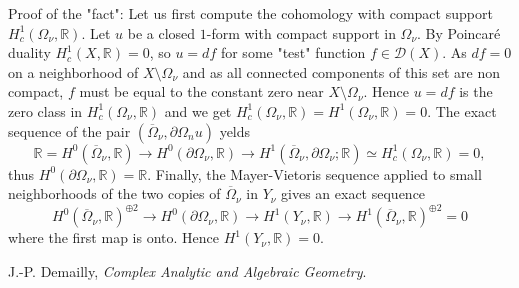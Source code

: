 \documentclass[12pt]{article}
\begin{document}
Proof of the "fact": Let us first compute the cohomology with compact support $H^1_c(\Omega_\nu,\mathbb R)$. Let $u$ be a closed $1$-form with compact support in $\Omega_\nu$. By Poincar\'e duality $H^1_c(X,\mathbb R)=0$, so $u=df$ for some "test" function $f\in\mathcal D(X)$. As $df=0$ on a neighborhood of $X\setminus\Omega_\nu$ and as all connected components of this set are non compact, $f$ must be equal to the constant zero near $X\setminus\Omega_\nu$. Hence $u=df$ is the zero class in $H^1_c(\Omega_\nu,\mathbb R)$ and we get $H^1_c(\Omega_\nu,\mathbb R)=H^1(\Omega_\nu,\mathbb R)=0$. The exact sequence of the pair $(\overline\Omega_\nu,\partial\Omega_nu)$ yelds
$$
\mathbb R=H^0(\overline\Omega_\nu,\mathbb R)\to H^0(\partial\Omega_\nu,\mathbb R)\to H^1(\overline\Omega_\nu,\partial\Omega_\nu;\mathbb R)\simeq H^1_c(\Omega_\nu,\mathbb R)=0,
$$
thus $H^0(\partial\Omega_\nu,\mathbb R)=\mathbb R$. Finally, the Mayer-Vietoris sequence applied to small neighborhoods of the two copies of $\overline\Omega_\nu$ in $Y_\nu$ gives an exact sequence
$$
H^0(\overline\Omega_\nu,\mathbb R)^{\oplus 2}\to H^0(\partial\Omega_\nu,\mathbb R)\to H^1(Y_\nu,\mathbb R)\to H^1(\overline\Omega_\nu,\mathbb R)^{\oplus 2}=0
$$
where the first map is onto. Hence $H^1(Y_\nu,\mathbb R)=0$.

\begin{thebibliography}
{}J.-P. Demailly, \emph{Complex Analytic and Algebraic Geometry}.
\end{thebibliography}
\end{document}
